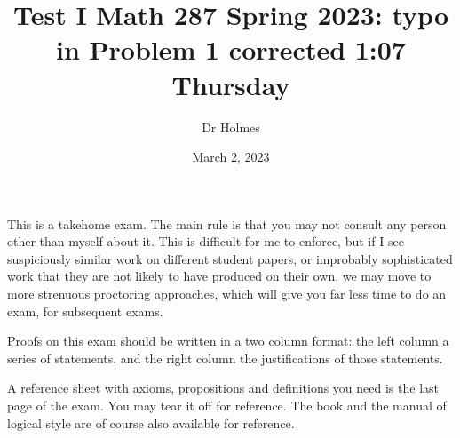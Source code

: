 \documentclass[12pt]{article}
\title{Test I Math 287 Spring 2023:  typo in Problem 1  corrected 1:07 Thursday}
\author{Dr Holmes}
\date{March 2, 2023}
\begin{document}
\maketitle

This is a takehome exam. The main rule is that you may not consult any person other than myself about it.  This is difficult for me to enforce, but if I see
suspiciously similar work on different student papers, or improbably sophisticated work that they are not likely to have produced on their own, we may move to more strenuous proctoring approaches, which will give you far less time to do an exam, for subsequent exams.

Proofs on this exam should be written in a two column format:  the left column a series of statements, and the right column the justifications of those statements.

A reference sheet with axioms, propositions and definitions you need is the last page of the exam.  You may tear it off for reference.  The book and the manual of logical style are of course also available for reference.



\newpage
\end{document}
